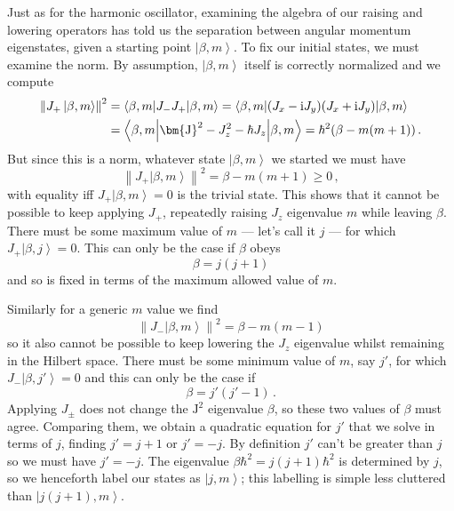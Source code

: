 \documentclass{article}
\theoremstyle{plain}\theoremheaderfont{\normalfont\itshape}\theorembodyfont{\rmfamily}\theoremseparator{.}\newtheorem*{rem}{Remark}\newtheorem*{ex}{Example}\newtheorem*{proof}{Proof}\newtheorem*{altp}{Alternative proof}
\theoremstyle{plain}\theoremheaderfont{\normalfont\bfseries}\theorembodyfont{\rmfamily}\theoremseparator{.}\newtheorem{thm}{Theorem}[section]\newtheorem{lem}[thm]{Lemma}\newtheorem{prop}[thm]{Proposition}\newtheorem*{cor}{Corollary}\newtheorem{defn}[thm]{Definition}\newtheorem{clm}[thm]{Claim}\newtheorem{clminproof}{Claim}
\theoremstyle{break}\theoremheaderfont{\normalfont\itshape}\theorembodyfont{\rmfamily}\theoremseparator{.\medskip}\newtheorem*{proofskip}{Proof}\newtheorem*{exs}{Examples}\newtheorem*{rems}{Remarks}
\theoremstyle{break}\theoremheaderfont{\normalfont\bfseries}\theorembodyfont{\rmfamily}\theoremseparator{.\medskip}\newtheorem{lemskip}[thm]{Lemma}\newtheorem{defnskip}[thm]{Definition}\newtheorem{propskip}[thm]{Proposition}\newtheorem{thmskip}[thm]{Theorem}
\numberwithin{equation}{section}
\newcommand{\ii}{\mathrm{i}}
\newcommand{\ket}[1]{\left| #1 \right\rangle}
\newcommand{\expval}[2]{\left\langle #2 \middle| #1 \middle| #2 \right\rangle}
\newcommand{\vb}[1]{\bm{\mathrm{#1}}}
\newcommand{\norm}[1]{\left\| #1 \right\|}
\begin{document}
    Just as for the harmonic oscillator, examining the algebra of our raising and lowering operators has told us the separation between angular momentum eigenstates, given a starting point \(\ket{\beta,m}\). To fix our initial states, we must examine the norm. By assumption, \(\ket{\beta,m}\) itself is correctly normalized and we compute
    \begin{align}
        \norm{J_+\ket{\beta,m}}^2&=\expval{J_-J_+}{\beta,m}=\expval{(J_x-\ii J_y)(J_x+\ii J_y)}{\beta,m}\notag\\
        &=\expval{\vb{J}^2-J_z^2-\hbar J_z}{\beta,m}=\hbar^2(\beta-m(m+1))\,.
    \end{align}
    But since this is a norm, whatever state \(\ket{\beta,m}\) we started we must have
    \begin{equation}
        \norm{J_+\ket{\beta,m}}^2=\beta-m(m+1)\ge 0\,,
    \end{equation}
    with equality iff \(J_+\ket{\beta,m}=0\) is the trivial state. This shows that it cannot be possible to keep applying \(J_+\), repeatedly raising \(J_z\) eigenvalue \(m\) while leaving \(\beta\). There must be some maximum value of \(m\) --- let's call it \(j\) --- for which \(J_+\ket{\beta,j}=0\). This can only be the case if \(\beta\) obeys
    \begin{equation}
        \beta=j(j+1)
    \end{equation}
    and so is fixed in terms of the maximum allowed value of \(m\).

    Similarly for a generic \(m\) value we find
    \begin{equation}
        \norm{J_-\ket{\beta,m}}^2=\beta-m(m-1)
    \end{equation}
    so it also cannot be possible to keep lowering the \(J_z\) eigenvalue whilst remaining in the Hilbert space. There must be some minimum value of \(m\), say \(j'\), for which \(J_-\ket{\beta,j'}=0\) and this can only be the case if
    \begin{equation}
        \beta=j'(j'-1)\,.
    \end{equation}
    Applying \(J_\pm\) does not change the \(\vb{J}^2\) eigenvalue \(\beta\), so these two values of \(\beta\) must agree. Comparing them, we obtain a quadratic equation for \(j'\) that we solve in terms of \(j\), finding \(j'=j+1\) or \(j'=-j\). By definition \(j'\) can't be greater than \(j\) so we must have \(j'=-j\). The eigenvalue \(\beta\hbar^2=j(j+1)\hbar^2\) is determined by \(j\), so we henceforth label our states as \(\ket{j,m}\); this labelling is simple less cluttered than \(\ket{j(j+1),m}\).
    
\end{document}
